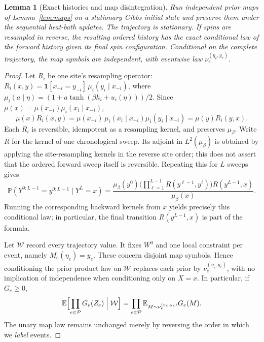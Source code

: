 \documentclass[11pt]{article}
\newtheorem{lemma}[theorem]{Lemma}
\theoremstyle{definition}\newtheorem{definition}[theorem]{Definition}
\theoremstyle{remark}\newtheorem{remark}[theorem]{Remark}
\newcommand{\E}{\mathbb E}\newcommand{\Prb}{\mathbb P}
\begin{document}
\begin{lemma}[Exact histories and map disintegration]\label{lem:stationary}
Run independent prior maps of Lemma~\ref{lem:maps} on a stationary Gibbs initial state and preserve them under the sequential heat-bath updates. The trajectory is stationary. If spins are resampled in reverse, the resulting ordered history has the exact conditional law of the forward history given its final spin configuration. Conditional on the complete trajectory, the map symbols are independent, with eventwise law \(\nu_e^{(\eta_e,y_e)}\).
\end{lemma}
\begin{proof}
Let \(R_i\) be one site's resampling operator: \(R_i(x,y)=\mathbf 1[x_{-i}=y_{-i}]\,\mu_i(y_i\mid x_{-i})\), where \(\mu_i(a\mid\eta)=(1+a\tanh(\beta h_i+u_i(\eta)))/2\). Since \(\mu(x)=\mu(x_{-i})\mu_i(x_i\mid x_{-i})\),
\[
 \mu(x)R_i(x,y)=\mu(x_{-i})\,\mu_i(x_i\mid x_{-i})\mu_i(y_i\mid x_{-i})=\mu(y)R_i(y,x).
\]
Each \(R_i\) is reversible, idempotent as a resampling kernel, and preserves \(\mu_\beta\). Write \(R\) for the kernel of one chronological sweep. Its adjoint in \(L^2(\mu_\beta)\) is obtained by applying the site-resampling kernels in the reverse site order; this does not assert that the ordered forward sweep itself is reversible. Repeating this for \(L\) sweeps gives
\[
 \Prb(Y^{0:L-1}=y^{0:L-1}\mid Y^L=x)=\frac{\mu_\beta(y^0)\bigl(\prod_{\ell=1}^{L-1}R(y^{\ell-1},y^\ell)\bigr)R(y^{L-1},x)}{\mu_\beta(x)}.
\]
Running the corresponding backward kernels from \(x\) yields precisely this conditional law; in particular, the final transition \(R(y^{L-1},x)\) is part of the formula.

Let \(\mathcal W\) record every trajectory value. It fixes \(W^0\) and one local constraint per event, namely \(M_e(\eta_e)=y_e\). These concern disjoint map symbols. Hence conditioning the prior product law on \(\mathcal W\) replaces each prior by \(\nu_e^{(\eta_e,y_e)}\), with no implication of independence when conditioning only on \(X=x\). In particular, if \(G_e\ge0\),
\[
 \E\Bigl[\prod_{e\in\mathcal P}G_e(Z_e)\Bigm|\mathcal W\Bigr]=\prod_{e\in\mathcal P}\E_{M\sim\nu_e^{(\eta_e,y_e)}}G_e(M).
\]
The unary map law remains unchanged merely by reversing the order in which we \emph{label} events.
\end{proof}
\end{document}
